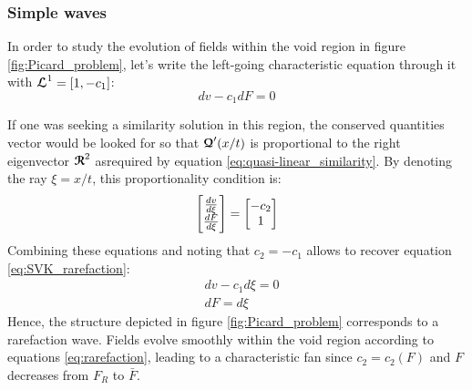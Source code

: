 \subsubsection*{Simple waves}
In order to study the evolution of fields within the void region in figure \ref{fig:Picard_problem}, let's write the left-going characteristic equation through it with ${\boldsymbol{\mathcal{L}}}^1=[1,-c_1]$:
\begin{equation}
  \label{eq:SVK_rarefaction}
  dv -c_1  dF = 0 %
\end{equation}

\begin{remark}
  If one was seeking a similarity solution in this region, the conserved quantities vector would be looked for so that ${\boldsymbol{\mathcal{Q}}}'(x/t)$ is proportional to the right eigenvector ${\boldsymbol{\mathcal{R}}}^2$ asrequired by equation \eqref{eq:quasi-linear_similarity}. By denoting the ray $\xi=x/t$, this proportionality condition is:
  \begin{equation*}
    \left[\begin{matrix}\frac{d v}{d \xi} \\ \frac{d F}{d \xi}\end{matrix}\right] = \left[\begin{matrix} -c_2 \\ 1\end{matrix}\right]
  \end{equation*}
  Combining  these equations and noting that $c_2=-c_1$ allows to recover equation \eqref{eq:SVK_rarefaction}:
  \begin{equation}
    \label{eq:rarefaction}
    \begin{aligned}
      & dv -c_1 d\xi = 0\\
      & dF = d\xi
    \end{aligned}
  \end{equation}
Hence, the structure depicted in figure \ref{fig:Picard_problem} corresponds to a rarefaction wave. Fields evolve smoothly within the void region according to equations \eqref{eq:rarefaction}, leading to a characteristic fan since $c_2=c_2(F)$ and $F$ decreases from $F_R$ to $\bar{F}$.
\end{remark}


